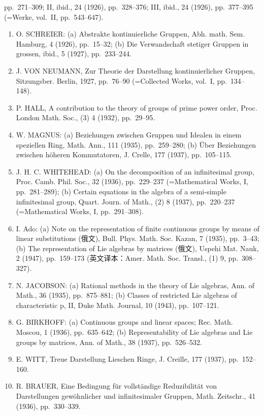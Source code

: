 pp.~271--309; II, ibid., 24 (1926), pp.~328--376; III, ibid., 24 (1926), pp.~377--395 (=Werke, vol.~II, pp.~543--647).

\begin{enumerate}
\def\labelenumi{\arabic{enumi}.}
\setcounter{enumi}{21}
\item
  O. SCHREIER: (a) Abstrakte kontinuierliche Gruppen, Abh. math. Sem. Hamburg, 4 (1926), pp.~15--32; (b) Die Verwandschaft stetiger Gruppen in grossen, ibid., 5 (1927), pp.~233--244.
\item
  J. VON NEUMANN, Zur Theorie der Darstellung kontinuierlicher Gruppen, Sitzungsber. Berlin, 1927, pp.~76--90 (=Collected Works, vol.~I, pp.~134--148).
\item
  P. HALL, A contribution to the theory of groups of prime power order, Proc. London Math. Soc., (3) 4 (1932), pp.~29--95.
\item
  W. MAGNUS: (a) Beziehungen zwischen Gruppen und Idealen in einem speziellen Ring, Math. Ann., 111 (1935), pp.~259--280; (b) Über Beziehungen zwischen höheren Kommutatoren, J. Crelle, 177 (1937), pp.~105--115.
\item
  J. H. C. WHITEHEAD: (a) On the decomposition of an infinitesimal group, Proc. Camb. Phil. Soc., 32 (1936), pp.~229--237 (=Mathematical Works, I, pp.~281--289); (b) Certain equations in the algebra of a semi-simple infinitesimal group, Quart. Journ. of Math., (2) 8 (1937), pp.~220--237 (=Mathematical Works, I, pp.~291--308).
\item
  I. Ado: (a) Note on the representation of finite continuous groups by means of linear substitutions (俄文), Bull. Phys. Math. Soc. Kazan, 7 (1935), pp.~3--43; (b) The representation of Lie algebras by matrices (俄文), Uspehi Mat. Nauk, 2 (1947), pp.~159--173 (英文译本：Amer. Math. Soc. Transl., (1) 9, pp.~308--327).
\item
  N. JACOBSON: (a) Rational methods in the theory of Lie algebras, Ann. of Math., 36 (1935), pp.~875--881; (b) Classes of restricted Lie algebras of characteristic p, II, Duke Math. Journal, 10 (1943), pp.~107--121.
\item
  G. BIRKHOFF: (a) Continuous groups and linear spaces; Rec. Math. Moscou, 1 (1936), pp.~635--642; (b) Representability of Lie algebras and Lie groups by matrices, Ann. of Math., 38 (1937), pp.~526--532.
\item
  E. WITT, Treue Darstellung Lieschen Ringe, J. Creille, 177 (1937), pp.~152--160.
\item
  R. BRAUER, Eine Bedingung für vollständige Reduzibilität von Darstellungen gewöhnlicher und infinitesimaler Gruppen, Math. Zeitschr., 41 (1936), pp.~330--339.

\end{enumerate}
